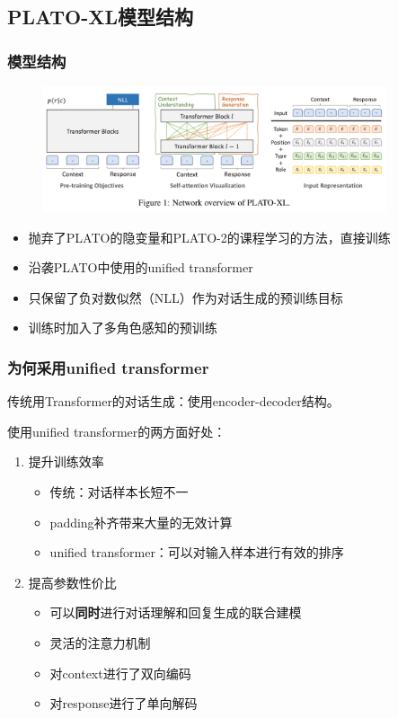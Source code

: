 \documentclass{beamer}
\begin{document}
\subsection{PLATO-XL模型结构}
\begin{frame}
    \frametitle{模型结构}

    \begin{figure}[tb]
        \centering
        \includegraphics[width=0.9\textwidth]{fig/plato-xl_arc.png}
    \end{figure}

    \begin{itemize}
        \item 抛弃了PLATO的隐变量和PLATO-2的课程学习的方法，直接训练
        \item 沿袭PLATO中使用的unified transformer
        \item 只保留了负对数似然（NLL）作为对话生成的预训练目标
        \item 训练时加入了多角色感知的预训练
    \end{itemize}
\end{frame}

\begin{frame}
    \frametitle{为何采用unified transformer}

    传统用Transformer的对话生成：使用encoder-decoder结构。

    使用unified transformer的两方面好处：

    \begin{enumerate}
        \item 提升训练效率
        \begin{itemize}
            \item 传统：对话样本长短不一
            \item padding补齐带来大量的无效计算
            \item unified transformer：可以对输入样本进行有效的排序
        \end{itemize}
        \item 提高参数性价比
        \begin{itemize}
            \item 可以\textbf{同时}进行对话理解和回复生成的联合建模
            \item 灵活的注意力机制
            \item 对context进行了双向编码
            \item 对response进行了单向解码
        \end{itemize}
    \end{enumerate}
\end{frame}
\end{document}
